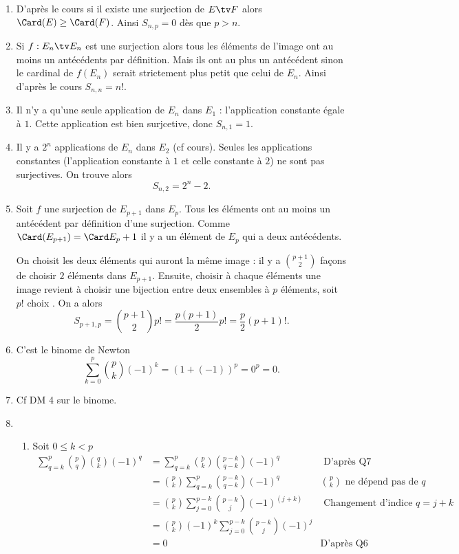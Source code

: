 \begin{correction}
\begin{enumerate}
\item  D'après le cours si il existe une surjection de $E\tv F$ alors $\Card(E) \geq \Card(F)$. Ainsi $S_{n,p}=0$ dès que $p>n$.  
\item Si $f :E_n\tv E_n$ est une surjection alors tous les éléments de l'image ont au moins un antécédents par définition. Mais ils ont au plus un antécédent sinon le cardinal de $f(E_n) $ serait strictement plus petit que celui de $E_n$. Ainsi d'après le cours $S_{n,n} =n!$. 
\item Il n'y a qu'une seule application de $E_n$ dans $E_1$ : l'application constante égale à $1$. Cette application est bien surjcetive, donc $S_{n,1} = 1$. 
\item Il y a  $2^n$ applications de $E_n $ dans $E_2$ (cf cours). Seules les applications constantes (l'application constante à $
1$ et celle constante à $2$) ne sont pas surjectives. On trouve alors 
$$S_{n,2} = 2^n -2.$$ 
\item Soit $f$ une surjection de $E_{p+1}$ dans $E_p$. Tous les éléments ont au moins un antécédent par définition d'une surjection.  Comme  $\Card(E_{p+1}) =\Card E_p +1 $ il y a un élément de $E_p$ qui a deux antécédents. 

On choisit les deux éléments qui auront la même image : 
il y  a $\binom{p+1}{2}$ façons de choisir $2$ éléments dans $E_{p+1}$. Ensuite, choisir à chaque éléments une image revient à choisir une bijection entre deux ensembles à $p$ éléments, soit $p!$ choix .
On  a alors $$S_{p+1,p} = \binom{p+1}{2} p! = \frac{p(p+1)}{2} p! = \frac{p}{2}(p+1)!.$$


 \item C'est le binome de Newton 
 $$\sum_{k= 0}^p \binom{p}{k}(-1)^k  =(1+(-1))^p = 0^p =0.$$ 
 \item Cf DM 4 sur le binome. 
 \item 
 \begin{enumerate}
\item Soit
$0\leq k <p$ 
\begin{align*}
\sum_{q=k}^p \binom{p}{q}\binom{q}{k} (-1)^q &= \sum_{q=k}^p\binom{p}{k}\binom{p-k}{q-k}(-1)^q &\text{ D'après Q7} \\
&= \binom{p}{k} \sum_{q=k}^p\binom{p-k}{q-k}(-1)^q &\binom{p}{k} \text{ ne dépend pas de $q$}\\
&= \binom{p}{k} \sum_{j=0}^{p-k}\binom{p-k}{j}(-1)^{(j+k)}& \text{ Changement d'indice $q= j+k$}\\
&= \binom{p}{k}(-1)^k \sum_{j=0}^{p-k}\binom{p-k}{j}(-1)^{j}\\
&= 0 &\text{D'après Q6}
\end{align*}


\end{enumerate}
\end{enumerate}
\end{correction}
